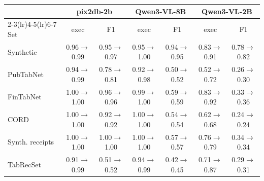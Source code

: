 \begin{tabular}{lcccccc}
\toprule
& \multicolumn{2}{c}{pix2db-2b} & \multicolumn{2}{c}{Qwen3-VL-8B} & \multicolumn{2}{c}{Qwen3-VL-2B}\\
\cmidrule(lr){2-3}\cmidrule(lr){4-5}\cmidrule(lr){6-7}
Set & exec & F1 & exec & F1 & exec & F1 \\
\midrule
Synthetic & 0.96$\to$0.99 & 0.95$\to$0.97 & 0.95$\to$1.00 & 0.94$\to$0.95 & 0.83$\to$0.91 & 0.78$\to$0.82 \\
PubTabNet & 0.94$\to$0.99 & 0.78$\to$0.81 & 0.92$\to$0.98 & 0.50$\to$0.52 & 0.52$\to$0.72 & 0.26$\to$0.30 \\
FinTabNet & 1.00$\to$1.00 & 0.96$\to$0.96 & 0.99$\to$1.00 & 0.59$\to$0.59 & 0.83$\to$0.92 & 0.33$\to$0.36 \\
CORD & 1.00$\to$1.00 & 0.92$\to$0.92 & 1.00$\to$1.00 & 0.54$\to$0.54 & 0.62$\to$0.68 & 0.24$\to$0.24 \\
Synth. receipts & 1.00$\to$1.00 & 1.00$\to$1.00 & 1.00$\to$1.00 & 0.57$\to$0.57 & 0.76$\to$0.79 & 0.34$\to$0.34 \\
TabRecSet & 0.91$\to$0.99 & 0.51$\to$0.52 & 0.94$\to$0.99 & 0.42$\to$0.45 & 0.71$\to$0.87 & 0.29$\to$0.31 \\
\bottomrule
\end{tabular}